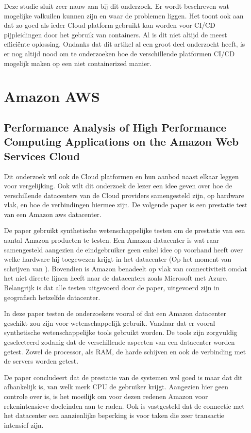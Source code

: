 Deze studie \autocite{Debroy2018} sluit zeer nauw aan bij dit onderzoek. Er wordt beschreven wat mogelijke valkuilen kunnen zijn en waar de problemen liggen. Het toont ook aan dat zo goed als ieder Cloud platform gebruikt kan worden voor CI/CD pijpleidingen door het gebruik van containers. Al is dit niet altijd de meest efficiënte oplossing. Ondanks dat dit artikel al een groot deel onderzocht heeft, is er nog altijd nood om te onderzoeken hoe de verschillende platformen CI/CD mogelijk maken op een niet containerized manier.

\section{Amazon AWS}
\subsection{Performance Analysis of High Performance Computing Applications on the Amazon Web Services Cloud}
Dit onderzoek wil ook de Cloud platformen en hun aanbod naast elkaar leggen voor vergelijking. Ook wilt dit onderzoek de lezer een idee geven over hoe de verschillende datacenters van de Cloud providers samengesteld zijn, op hardware vlak, en hoe de verbindingen hiermee zijn. De volgende paper \autocite{Jackson2010} is een prestatie test van een Amazon aws datacenter.

De paper \autocite{Jackson2010} gebruikt synthetische wetenschappelijke testen om de prestatie van een aantal Amazon producten te testen. Een Amazon datacenter is wat raar samengesteld aangezien de eindgebruiker geen enkel idee op voorhand heeft over welke hardware hij toegewezen krijgt in het datacenter (Op het moment van schrijven van \autocite{Jackson2010}). Bovendien is Amazon benadeelt op vlak van connectiviteit omdat het niet directe lijnen heeft naar de datacenters zoals Microsoft met Azure. Belangrijk is dat alle testen uitgevoerd door de paper, uitgevoerd zijn in geografisch hetzelfde datacenter.

In deze paper \autocite{Jackson2010} testen de onderzoekers vooral of dat een Amazon datacenter geschikt zou zijn voor wetenschappelijk gebruik. Vandaar dat er vooral synthetische wetenschappelijke tools gebruikt worden. De tools zijn zorgvuldig geselecteerd zodanig dat de verschillende aspecten van een datacenter worden getest. Zowel de processor, als RAM, de harde schijven en ook de verbinding met de servers worden getest.

De paper \autocite{Jackson2010} concludeert dat de prestatie van de systemen wel goed is maar dat dit afhankelijk is, van welk merk CPU de gebruiker krijgt. Aangezien hier geen controle over is, is het moeilijk om voor dezen redenen Amazon voor rekenintensieve doeleinden aan te raden. Ook is vastgesteld dat de connectie met het datacenter een aanzienlijke beperking is voor taken die zeer transactie intensief zijn.


